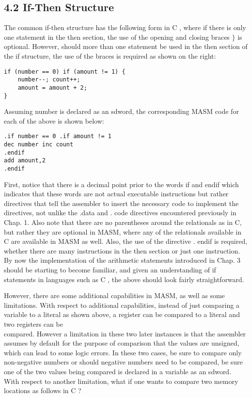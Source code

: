 \documentclass[10pt]{article}
\begin{document}
\subsection*{4.2 If-Then Structure}
The common if-then structure has the following form in C , where if there is only one statement in the then section, the use of the opening and closing braces $\}$ is optional. However, should more than one statement be used in the then section of the if structure, the use of the braces is required as shown on the right:

\begin{verbatim}
if (number == 0) if (amount != 1) {
    number--; count++;
    amount = amount + 2;
}
\end{verbatim}

Assuming number is declared as an sdword, the corresponding MASM code for each of the above is shown below:

\begin{verbatim}
.if number == 0 .if amount != 1
dec number inc count
.endif
add amount,2
.endif
\end{verbatim}

First, notice that there is a decimal point prior to the words if and endif which indicates that these words are not actual executable instructions but rather directives that tell the assembler to insert the necessary code to implement the directives, not unlike the .data and . code directives encountered previously in Chap. 1. Also note that there are no parentheses around the relationals as in C, but rather they are optional in MASM, where any of the relationals available in C are available in MASM as well. Also, the use of the directive . endif is required, whether there are many instructions in the then section or just one instruction. By now the implementation of the arithmetic statements introduced in Chap. 3 should be starting to become familiar, and given an understanding of if statements in languages such as C , the above should look fairly straightforward.

However, there are some additional capabilities in MASM, as well as some limitations. With respect to additional capabilities, instead of just comparing a variable to a literal as shown above, a register can be compared to a literal and two registers can be\\
compared. However a limitation in these two later instances is that the assembler assumes by default for the purpose of comparison that the values are unsigned, which can lead to some logic errors. In these two cases, be sure to compare only non-negative numbers or should negative numbers need to be compared, be sure one of the two values being compared is declared in a variable as an sdword. With respect to another limitation, what if one wants to compare two memory locations as follows in C ?
\end{document}
